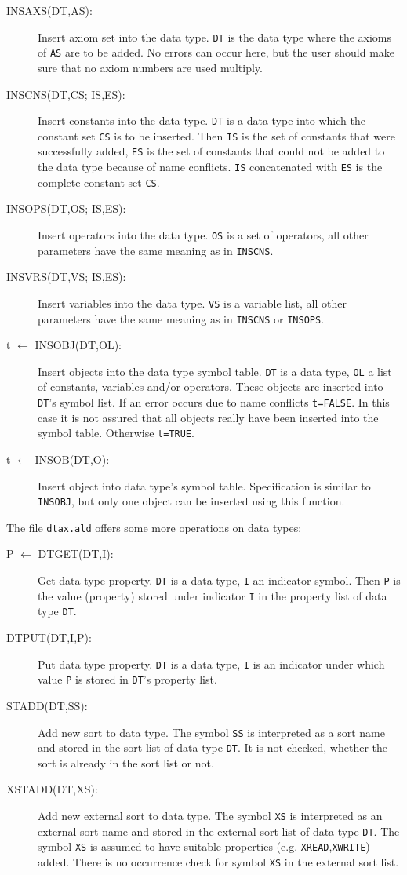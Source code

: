 \begin{description}
\item[INSAXS(DT,AS):] Insert axiom set into the data type. {\tt DT} is
the data type where the axioms of {\tt AS} are to be added.
No errors can occur here, but the user should make sure that no
axiom numbers are used multiply.
\item[INSCNS(DT,CS; IS,ES):] Insert constants into the data type. {\tt DT}
is a data type into which the constant set {\tt CS} is to be inserted.
Then {\tt IS} is the set of constants that were successfully added,
{\tt ES} is the set of constants that could not be added to the data
type because of name conflicts. {\tt IS} concatenated with {\tt ES}
is the complete constant set {\tt CS}.
\item[INSOPS(DT,OS; IS,ES):] Insert operators into the data type. {\tt OS}
is a set of operators, all other parameters have the same meaning as
in {\tt INSCNS}.
\item[INSVRS(DT,VS; IS,ES):] Insert variables into the data type. {\tt VS}
is a variable list, all other parameters have the same meaning as in
{\tt INSCNS} or {\tt INSOPS}.
\item[t $\leftarrow$ INSOBJ(DT,OL):] Insert objects into the data type
symbol table. 
{\tt DT} is a data type, {\tt OL} a list of constants,
variables and/or operators. These objects are inserted into {\tt DT}'s
symbol list. If an error occurs due to name conflicts {\tt t=FALSE}.
In this case it is not assured that all objects really have been inserted
into the symbol table. Otherwise {\tt t=TRUE}.
\item[t $\leftarrow$ INSOB(DT,O):] Insert object into data type's
symbol table. Specification is similar to {\tt INSOBJ}, but only
one object can be inserted using this function.
\end{description}

The file {\tt dtax.ald} offers some more operations on data types:

\begin{description}
\item[P $\leftarrow$ DTGET(DT,I):] Get data type property. {\tt DT}
is a data type, {\tt I} an indicator symbol. Then {\tt P} is the value
(property) stored under indicator {\tt I} in the property list of
data type {\tt DT}.
\item[DTPUT(DT,I,P):] Put data type property. {\tt DT} is a data type,
{\tt I} is an indicator under which value {\tt P} is stored in {\tt DT}'s
property list.
\item[STADD(DT,SS):] Add new sort to data type. The symbol {\tt SS}
is interpreted as a sort name and stored in the sort list of data type
{\tt DT}. It is not checked, whether the sort is already in the sort list
or not.
\item[XSTADD(DT,XS):] Add new external sort to data type. The symbol
{\tt XS} is interpreted as an external sort name and stored in the
external sort list of data type {\tt DT}. The symbol {\tt XS} is
assumed to have suitable properties (e.g. {\tt XREAD},{\tt XWRITE})
added. There is no occurrence check for symbol {\tt XS} in the external
sort list.
\end{description}

